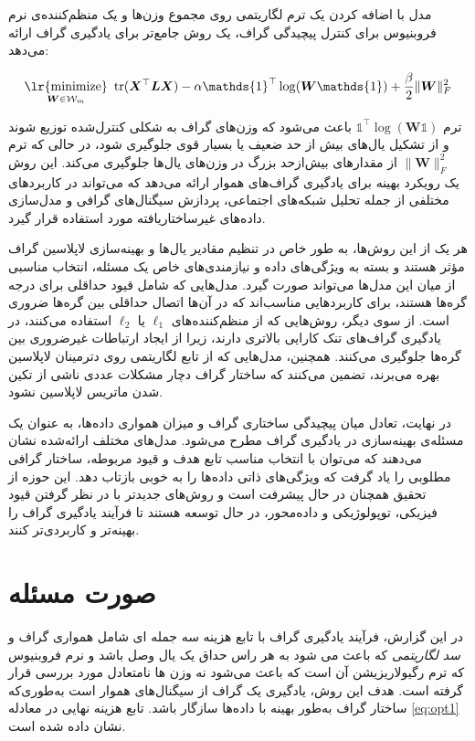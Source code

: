 \documentclass[10pt,twocolumn,a4paper]{article}
\newcommand\minimize[1]{\mathop{\text{\lr{minimize}}}\limits_{#1}\ }
\begin{document}
	مدل 
	\cite{Kalofolias2016}
	با اضافه کردن یک ترم لگاریتمی روی مجموع وزن‌ها و یک منظم‌کننده‌ی نرم فروبنیوس برای کنترل پیچیدگی گراف، یک روش جامع‌تر برای یادگیری گراف ارائه می‌دهد:
	
	\begin{equation}
		\minimize{\bm{W}\in\mathcal{W}_m} \text{tr} (\bm{X}^\top \bm{L} \bm{X}) - \alpha \mathds{1}^\top \log (\bm{W} \mathds{1}) + \frac{\beta}{2} \|\bm{W}\|_F^2
	\end{equation}
	
	ترم \( \mathds{1}^\top \log (\bm{W} \mathds{1}) \) باعث می‌شود که وزن‌های گراف به شکلی کنترل‌شده توزیع شوند و از تشکیل یال‌های بیش از حد ضعیف یا بسیار قوی جلوگیری شود، در حالی که ترم \( \|\bm{W}\|_F^2 \) از مقدارهای بیش‌ازحد بزرگ در وزن‌های یال‌ها جلوگیری می‌کند. این روش یک رویکرد بهینه برای یادگیری گراف‌های هموار ارائه می‌دهد که می‌تواند در کاربردهای مختلفی از جمله تحلیل شبکه‌های اجتماعی، پردازش سیگنال‌های گرافی و مدل‌سازی داده‌های غیرساختاریافته مورد استفاده قرار گیرد.
	
	هر یک از این روش‌ها، به طور خاص در تنظیم مقادیر یال‌ها و بهینه‌سازی لاپلاسین گراف مؤثر هستند و بسته به ویژگی‌های داده و نیازمندی‌های خاص یک مسئله، انتخاب مناسبی از میان این مدل‌ها می‌تواند صورت گیرد. مدل‌هایی که شامل قیود حداقلی برای درجه گره‌ها هستند، برای کاربردهایی مناسب‌اند که در آن‌ها اتصال حداقلی بین گره‌ها ضروری است. از سوی دیگر، روش‌هایی که از منظم‌کننده‌های \(\ell_1\) یا \(\ell_2\) استفاده می‌کنند، در یادگیری گراف‌های تنک کارایی بالاتری دارند، زیرا از ایجاد ارتباطات غیرضروری بین گره‌ها جلوگیری می‌کنند. همچنین، مدل‌هایی که از تابع لگاریتمی روی دترمینان لاپلاسین بهره می‌برند، تضمین می‌کنند که ساختار گراف دچار مشکلات عددی ناشی از تکین شدن ماتریس لاپلاسین نشود.
	
	در نهایت، تعادل میان پیچیدگی ساختاری گراف و میزان همواری داده‌ها، به عنوان یک مسئله‌ی بهینه‌سازی در یادگیری گراف مطرح می‌شود. مدل‌های مختلف ارائه‌شده نشان می‌دهند که می‌توان با انتخاب مناسب تابع هدف و قیود مربوطه، ساختار گرافی مطلوبی را یاد گرفت که ویژگی‌های ذاتی داده‌ها را به خوبی بازتاب دهد. این حوزه از تحقیق همچنان در حال پیشرفت است و روش‌های جدیدتر با در نظر گرفتن قیود فیزیکی، توپولوژیکی و داده‌محور، در حال توسعه هستند تا فرآیند یادگیری گراف را بهینه‌تر و کاربردی‌تر کنند.
	
	
	
	\section{صورت مسئله}
	
	در این گزارش، فرآیند یادگیری گراف با تابع هزینه سه جمله ای شامل همواری گراف و 
	\textit{سد لگاریتمی}
	 که باعث می شود به هر راس حداق یک یال وصل باشد و نرم فروبنیوس که ترم رگیولاریزیشن آن است که باعث می‌شود نه وزن ها نامتعادل 
	\cite{Kalofolias2016} 
	مورد بررسی قرار گرفته است. هدف این روش، یادگیری یک گراف از سیگنال‌های هموار
	است به‌طوری‌که ساختار گراف به‌طور بهینه با داده‌ها سازگار باشد. تابع هزینه نهایی در معادله 
	\ref{eq:opt1}
	نشان داده شده است.
	
\end{document}

